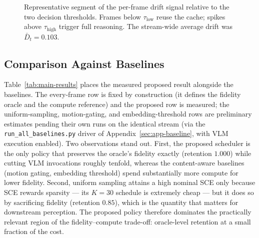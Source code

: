 \begin{figure}[htbp]
\centering
{}
\caption[Drift signal and thresholds]{Representative segment of the per-frame
drift signal relative to the two decision thresholds. Frames below
$\tau_{\text{low}}$ reuse the cache; spikes above $\tau_{\text{high}}$ trigger
full reasoning. The stream-wide average drift was $\bar{D}_t = 0.103$.}
\label{fig:drift}
\end{figure}

\subsection{Comparison Against Baselines}
\label{sec:exp-comparison}

Table~\ref{tab:main-results} places the measured proposed result alongside the
baselines. The every-frame row is fixed by construction (it defines the
fidelity oracle and the compute reference) and the proposed row is measured;
the uniform-sampling, motion-gating, and embedding-threshold rows are
preliminary estimates pending their own runs on the identical stream (via the
\texttt{run\_all\_baselines.py} driver of Appendix~\ref{sec:app-baseline},
with VLM execution enabled). Two observations stand out. First, the proposed
scheduler is the only policy that preserves the oracle's fidelity exactly
(retention $1.000$) while cutting VLM invocations roughly tenfold, whereas the
content-aware baselines (motion gating, embedding threshold) spend
substantially more compute for lower fidelity. Second, uniform sampling
attains a high nominal SCE only because SCE rewards sparsity --- its $K=30$
schedule is extremely cheap --- but it does so by sacrificing fidelity
(retention $0.85$), which is the quantity that matters for downstream
perception. The proposed policy therefore dominates the practically relevant
region of the fidelity--compute trade-off: oracle-level retention at a small
fraction of the cost.


